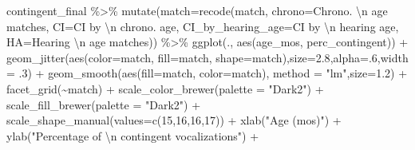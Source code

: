 \documentclass[
]{article}
\newenvironment{Shaded}{\begin{snugshade}}{\end{snugshade}}
\newcommand{\AttributeTok}[1]{\textcolor[rgb]{0.77,0.63,0.00}{#1}}
\newcommand{\DecValTok}[1]{\textcolor[rgb]{0.00,0.00,0.81}{#1}}
\newcommand{\FloatTok}[1]{\textcolor[rgb]{0.00,0.00,0.81}{#1}}
\newcommand{\FunctionTok}[1]{\textcolor[rgb]{0.00,0.00,0.00}{#1}}
\newcommand{\NormalTok}[1]{#1}
\newcommand{\SpecialCharTok}[1]{\textcolor[rgb]{0.00,0.00,0.00}{#1}}
\newcommand{\StringTok}[1]{\textcolor[rgb]{0.31,0.60,0.02}{#1}}
\begin{document}
\begin{Shaded}
\begin{Highlighting}[]
\NormalTok{contingent\_final }\SpecialCharTok{\%\textgreater{}\%}
  \FunctionTok{mutate}\NormalTok{(}\AttributeTok{match=}\FunctionTok{recode}\NormalTok{(match,}
                      \AttributeTok{chrono=}\StringTok{\textquotesingle{}Chrono. }\SpecialCharTok{\textbackslash{}n}\StringTok{ age matches\textquotesingle{}}\NormalTok{,}
                      \AttributeTok{CI=}\StringTok{\textquotesingle{}CI by }\SpecialCharTok{\textbackslash{}n}\StringTok{ chrono. age\textquotesingle{}}\NormalTok{,}
                      \AttributeTok{CI\_by\_hearing\_age=}\StringTok{\textquotesingle{}CI by }\SpecialCharTok{\textbackslash{}n}\StringTok{ hearing age\textquotesingle{}}\NormalTok{,}
                      \AttributeTok{HA=}\StringTok{\textquotesingle{}Hearing }\SpecialCharTok{\textbackslash{}n}\StringTok{ age matches\textquotesingle{}}\NormalTok{)) }\SpecialCharTok{\%\textgreater{}\%}
\FunctionTok{ggplot}\NormalTok{(., }\FunctionTok{aes}\NormalTok{(age\_mos, perc\_contingent)) }\SpecialCharTok{+}
  \FunctionTok{geom\_jitter}\NormalTok{(}\FunctionTok{aes}\NormalTok{(}\AttributeTok{color=}\NormalTok{match, }\AttributeTok{fill=}\NormalTok{match, }\AttributeTok{shape=}\NormalTok{match),}\AttributeTok{size=}\FloatTok{2.8}\NormalTok{,}\AttributeTok{alpha=}\NormalTok{.}\DecValTok{6}\NormalTok{,}\AttributeTok{width =}\NormalTok{ .}\DecValTok{3}\NormalTok{) }\SpecialCharTok{+}
  \FunctionTok{geom\_smooth}\NormalTok{(}\FunctionTok{aes}\NormalTok{(}\AttributeTok{fill=}\NormalTok{match, }\AttributeTok{color=}\NormalTok{match), }\AttributeTok{method =} \StringTok{"lm"}\NormalTok{,}\AttributeTok{size=}\FloatTok{1.2}\NormalTok{) }\SpecialCharTok{+} 
  \FunctionTok{facet\_grid}\NormalTok{(}\SpecialCharTok{\textasciitilde{}}\NormalTok{match) }\SpecialCharTok{+}
  \FunctionTok{scale\_color\_brewer}\NormalTok{(}\AttributeTok{palette =} \StringTok{"Dark2"}\NormalTok{) }\SpecialCharTok{+}
  \FunctionTok{scale\_fill\_brewer}\NormalTok{(}\AttributeTok{palette =} \StringTok{"Dark2"}\NormalTok{) }\SpecialCharTok{+}
  \FunctionTok{scale\_shape\_manual}\NormalTok{(}\AttributeTok{values=}\FunctionTok{c}\NormalTok{(}\DecValTok{15}\NormalTok{,}\DecValTok{16}\NormalTok{,}\DecValTok{16}\NormalTok{,}\DecValTok{17}\NormalTok{)) }\SpecialCharTok{+}
  \FunctionTok{xlab}\NormalTok{(}\StringTok{"Age (mos)"}\NormalTok{) }\SpecialCharTok{+}
  \FunctionTok{ylab}\NormalTok{(}\StringTok{"Percentage of }\SpecialCharTok{\textbackslash{}n}\StringTok{ contingent vocalizations"}\NormalTok{) }\SpecialCharTok{+} 

\end{Highlighting}
\end{Shaded}
\end{document}
